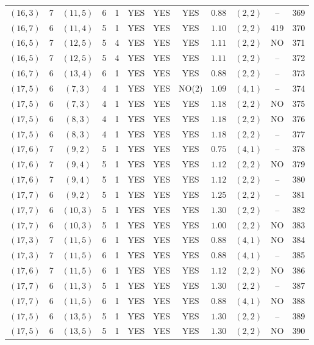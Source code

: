 \begin{longtable}{|c|c|c|c|c|c|c|c|c|c|c|c|}
$(16,3)$ & 7 & $(11,5)$ & 6 & 1 & YES & YES & YES & $0.88$ & $(2,2)$ & -- & 369\\
$(16,7)$ & 6 & $(11,4)$ & 5 & 1 & YES & YES & YES & $1.10$ & $(2,2)$ & 419 & 370\\
$(16,5)$ & 7 & $(12,5)$ & 5 & 4 & YES & YES & YES & $1.11$ & $(2,2)$ & NO & 371\\
$(16,5)$ & 7 & $(12,5)$ & 5 & 4 & YES & YES & YES & $1.11$ & $(2,2)$ & -- & 372\\
$(16,7)$ & 6 & $(13,4)$ & 6 & 1 & YES & YES & YES & $0.88$ & $(2,2)$ & -- & 373\\
$(17,5)$ & 6 & $(7,3)$ & 4 & 1 & YES & YES & NO(2) & $1.09$ & $(4,1)$ & -- & 374\\
$(17,5)$ & 6 & $(7,3)$ & 4 & 1 & YES & YES & YES & $1.18$ & $(2,2)$ & NO & 375\\
$(17,5)$ & 6 & $(8,3)$ & 4 & 1 & YES & YES & YES & $1.18$ & $(2,2)$ & NO & 376\\
$(17,5)$ & 6 & $(8,3)$ & 4 & 1 & YES & YES & YES & $1.18$ & $(2,2)$ & -- & 377\\
$(17,6)$ & 7 & $(9,2)$ & 5 & 1 & YES & YES & YES & $0.75$ & $(4,1)$ & -- & 378\\
$(17,6)$ & 7 & $(9,4)$ & 5 & 1 & YES & YES & YES & $1.12$ & $(2,2)$ & NO & 379\\
$(17,6)$ & 7 & $(9,4)$ & 5 & 1 & YES & YES & YES & $1.12$ & $(2,2)$ & -- & 380\\
$(17,7)$ & 6 & $(9,2)$ & 5 & 1 & YES & YES & YES & $1.25$ & $(2,2)$ & -- & 381\\
$(17,7)$ & 6 & $(10,3)$ & 5 & 1 & YES & YES & YES & $1.30$ & $(2,2)$ & -- & 382\\
$(17,7)$ & 6 & $(10,3)$ & 5 & 1 & YES & YES & YES & $1.00$ & $(2,2)$ & NO & 383\\
$(17,3)$ & 7 & $(11,5)$ & 6 & 1 & YES & YES & YES & $0.88$ & $(4,1)$ & NO & 384\\
$(17,3)$ & 7 & $(11,5)$ & 6 & 1 & YES & YES & YES & $0.88$ & $(4,1)$ & -- & 385\\
$(17,6)$ & 7 & $(11,5)$ & 6 & 1 & YES & YES & YES & $1.12$ & $(2,2)$ & NO & 386\\
$(17,7)$ & 6 & $(11,3)$ & 5 & 1 & YES & YES & YES & $1.30$ & $(2,2)$ & -- & 387\\
$(17,7)$ & 6 & $(11,5)$ & 6 & 1 & YES & YES & YES & $0.88$ & $(4,1)$ & NO & 388\\
$(17,5)$ & 6 & $(13,5)$ & 5 & 1 & YES & YES & YES & $1.30$ & $(2,2)$ & -- & 389\\
$(17,5)$ & 6 & $(13,5)$ & 5 & 1 & YES & YES & YES & $1.30$ & $(2,2)$ & NO & 390\\

\end{longtable}
